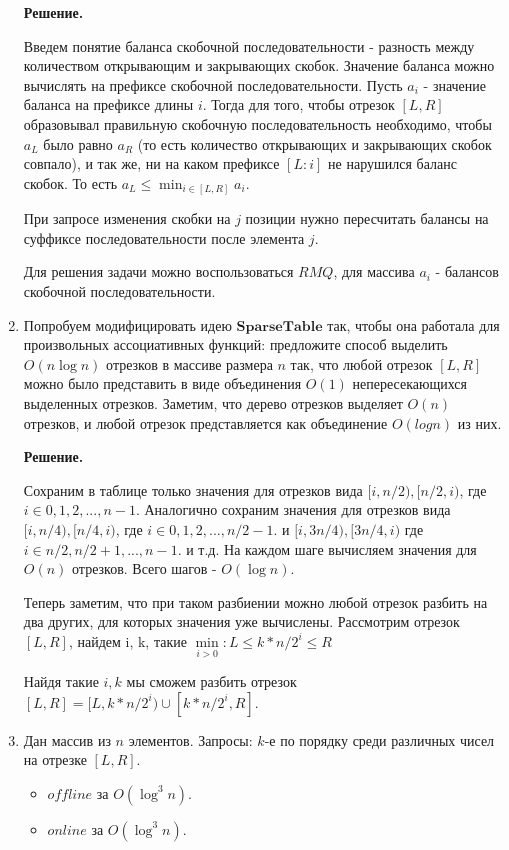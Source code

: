 \begin{enumerate}
	\textbf{Решение.}
	
	Введем понятие баланса скобочной последовательности - разность между количеством 
	открывающим и закрывающих скобок. Значение баланса можно вычислять на префиксе скобочной 
	последовательности. Пусть $a_i$ - значение баланса на префиксе длины $i$. Тогда для того, 
	чтобы отрезок $[L, R]$ образовывал правильную скобочную последовательность необходимо, 
	чтобы $a_L$ было равно $a_R$ (то есть количество открывающих и закрывающих скобок совпало), 
	и так же, ни на каком префиксе $[L:i]$ не нарушился баланс скобок. То есть $a_L \leqslant 
	\min_{i\in[L, R]} a_i$.
	
	При запросе изменения скобки на $j$ позиции нужно пересчитать балансы на суффиксе 
	последовательности после элемента $j$.
	
	Для решения задачи можно воспользоваться $RMQ$, для массива $a_i$ - балансов скобочной 
	последовательности.
	
	\item Попробуем модифицировать идею $\mathbf{SparseTable}$ так, чтобы она работала для 
	произвольных ассоциативных функций: предложите способ выделить $O(n \log n)$ отрезков в 
	массиве размера $n$ так, что любой отрезок $[L, R]$ можно было представить в виде 
	объединения $O(1)$ непересекающихся выделенных отрезков. Заметим, что дерево отрезков 
	выделяет $O(n)$ отрезков, и любой отрезок представляется как объединение $O(log n)$ из них.
	
	\textbf{Решение.}
	
	Сохраним в таблице только значения для отрезков вида $[i, n/2), [n/2, i)$, где $i\in 0, 1, 
	2,..., n - 1$. Аналогично сохраним значения для отрезков вида $[i, n/4), [n/4, i)$, где 
	$i\in 0, 1, 2,..., n/2 - 1$. и $[i, 3n/4), [3n/4, i)$ где $i\in n/2, n/2 + 1,..., n - 1$.
	и т.д. На каждом шаге вычисляем значения для $O(n)$ отрезков. Всего шагов - $O(\log n)$.
	
	Теперь заметим, что при таком разбиении можно любой отрезок разбить на два других, для 
	которых значения уже вычислены. Рассмотрим отрезок $[L, R]$, найдем i, k, такие 
	$\min\limits_{i > 0} : L\leqslant k*n/2^i \leqslant R$
	
	Найдя такие $i, k$ мы сможем разбить отрезок $[L,R] = [L, k*n/2^i) \cup [k*n/2^i, R]$. 
	
	\item Дан массив из $n$ элементов. Запросы: $k$-е по порядку среди различных чисел на отрезке $[L, R]$.
	\begin{itemize}
		\item $offline$ за $O(\log^3 n)$.
		\item $online$ за $O(\log^3 n)$.
	\end{itemize}
	

\end{enumerate}
